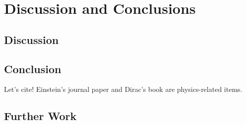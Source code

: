 
\chapter{Discussion and Conclusions}

\section{Discussion}

\section{Conclusion}

Let's cite! Einstein's journal paper \cite{einstein} and Dirac's book \cite{dirac} are physics-related items. 

\section{Further Work}
